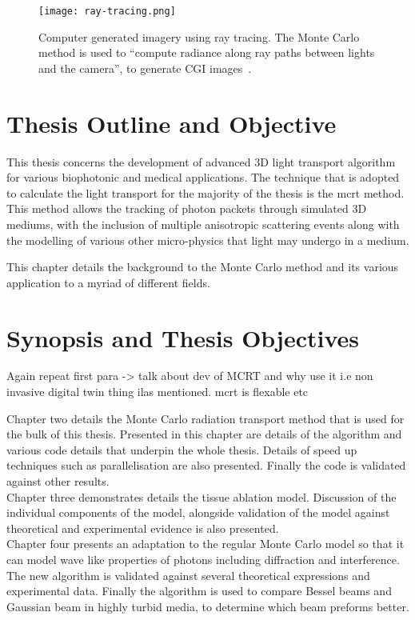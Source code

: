 \begin{figure}[!htb]
\centering
\texttt{[image: ray-tracing.png]}
\caption{Computer generated imagery using ray tracing. The Monte Carlo method is used to ``compute radiance along ray paths between lights and the camera'', to generate CGI images~\cite{pharr2016physically}.}
\label{fig:ray-trace}
\end{figure}


\section{Thesis Outline and Objective}

This thesis concerns the development of advanced 3D light transport algorithm for various biophotonic and medical applications.
The technique that is adopted to calculate the light transport for the majority of the thesis is the \gls*{mcrt} method.
This method allows the tracking of photon packets through simulated 3D mediums, with the inclusion of multiple anisotropic scattering events along with the modelling of various other micro-physics that light may undergo in a medium.


This chapter details the background to the Monte Carlo method and its various application to a myriad of different fields.


\section{Synopsis and Thesis Objectives}

Again repeat first para -> talk about dev of MCRT and why use it i.e non invasive digital twin thing ilas mentioned. mcrt is flexable etc


Chapter two details the Monte Carlo radiation transport method that is used for the bulk of this thesis.
Presented in this chapter are details of the algorithm and various code details that underpin the whole thesis.
Details of speed up techniques such as parallelisation are also presented.
Finally the code is validated against other results.\\


Chapter three demonstrates details the tissue ablation model.
Discussion of the individual components of the model, alongside validation of the model against theoretical and experimental evidence is also presented.\\


Chapter four presents an adaptation to the regular Monte Carlo model so that it can model wave like properties of photons including diffraction and interference.
The new algorithm is validated against several theoretical expressions and experimental data.
Finally the algorithm is used to compare Bessel beams and Gaussian beam in highly turbid media, to determine which beam preforms better.\\


